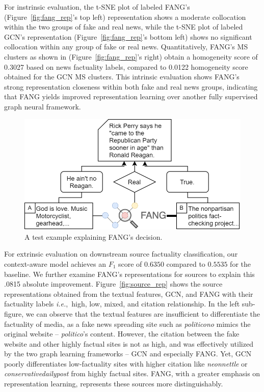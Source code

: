 \documentclass[sigconf,anonymous]{acmart}
\theoremstyle{definition}
\theoremstyle{hypothesis}
\begin{document}
For instrinsic evaluation, the t-SNE plot of labeled FANG's (Figure~\ref{fig:fang_rep}'s top left) representation shows a moderate collocation within the two groups of fake and real news, while the t-SNE plot of labeled GCN's representation (Figure~\ref{fig:fang_rep}'s bottom left) shows no significant collocation within any group of fake or real news. Quantitatively, FANG's MS clusters as shown in (Figure~\ref{fig:fang_rep}'s right) obtain a homogeneity score of 0.3027 based on news factuality labels, compared to 0.0122 homogeneity score obtained for the GCN MS clusters. This intrinsic evaluation shows FANG's strong representation closeness within both fake and real news groups, indicating that FANG yields improved representation learning over another fully supervised graph neural framework. 

\begin{figure}[t]
\centering
\includegraphics[scale=0.28]{micro1_chart.png}
\caption{A test example explaining FANG's decision.}
\label{fig:micro_1}
\end{figure}

For extrinsic evaluation on downstream source factuality classification, our context-aware model achieves an $F_1$ score of  $0.6350$ compared to $0.5535$ for the baseline. We further examine FANG's representations for sources to explain this .0815 absolute improvement. Figure~\ref{fig:source_rep} shows the source representations obtained from the textual features, GCN, and FANG with their factuality labels \textit{i.e.},~high, low, mixed, and citation relationship. In the left sub-figure, we can observe that the textual features are insufficient to differentiate the factuality of media, as a fake news spreading site such as \textit{politicono} mimics the original website  -- \textit{politico}'s content. However, the citation between the fake website and other highly factual sites is not as high, and was effectively utilized by the two graph learning frameworks -- GCN and especially FANG. Yet, GCN poorly differentiates low-factuality sites with higher citation like \textit{neonnettle} or \textit{conservativedailypost} from highly factual sites. FANG, with a greater emphasis on representation learning, represents these sources more distinguishably. 
\end{document}
